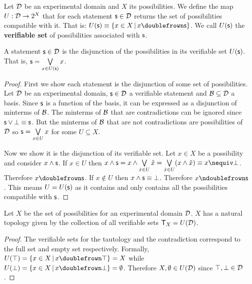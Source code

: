 \documentclass[11pt,letterpaper,fleqn]{memoir} %
\begin{document}
\begin{mathSection}
	
\begin{defn}
	Let $\mathcal{D}$ be an experimental domain and $X$ its possibilities. We define the map $U : \mathcal{D} \rightarrow 2^X$ that for each statement $\mathsf{s} \in \mathcal{D}$ returns the set of possibilities compatible with it. That is: $U(\obs)\equiv\{ x \in X \, | \, x \comp \obs\}$. We call $U(\mathsf{s})$ the \textbf{verifiable set} of possibilities associated with $\mathsf{s}$.
\end{defn}

\begin{prop}
	A statement $\mathsf{s} \in \mathcal{D}$ is the disjunction of the possibilities in its verifiable set $U(\mathsf{s})$. That is, $\mathsf{s}=\bigvee\limits_{x \in U(\mathsf{s})} x$.
\end{prop}
\begin{proof}
	First we show each statement is the disjunction of some set of possibilities. Let $\mathcal{D}$ be an experimental domain, $\mathsf{s} \in \mathcal{D}$ a verifiable statement and $\mathcal{B} \subseteq \mathcal{D}$ a basis. Since $\mathsf{s}$ is a function of the basis, it can be expressed as a disjunction of minterms of $\mathcal{B}$. The minterms of $\mathcal{B}$ that are contradictions can be ignored since $\mathsf{s} \vee \bot \equiv \mathsf{s}$. But the minterms of $\mathcal{B}$ that are not contradictions are possibilities of $\mathcal{D}$ so $\mathsf{s}=\bigvee\limits_{x \in U} x$ for some $U \subseteq X$.
	
	Now we show it is the disjunction of its verifiable set. Let $x \in X$ be a possibility and consider $x \wedge \mathsf{s}$. If $x\in U$ then $x \AND \obs = x \AND \bigOR\limits_{\hat{x} \in U} \hat{x} = \bigOR\limits_{\hat{x} \in U} ( x \AND \hat{x}) \equiv x \nequiv \contradiction$. Therefore $x \comp \obs$. If $x \notin U$ then $x \wedge \mathsf{s} \equiv \bot$. Therefore $x \ncomp \obs$. This means $U=U(\mathsf{s})$ as it contains and only contains all the possibilities compatible with $\mathsf{s}$.
\end{proof}

\begin{prop}
	Let $X$ be the set of possibilities for an experimental domain $\mathcal{D}$. $X$ has a natural topology given by the collection of all verifiable sets $\mathsf{T}_X=U(\mathcal{D})$.
\end{prop}

\begin{proof}
	The verifiable sets for the tautology and the contradiction correspond to the full set and empty set respectively. Formally, $U(\tautology) = \{ x \in X \, | \, x \comp \tautology\} = X$ while $U(\contradiction) = \{ x \in X \, | \, x \comp \contradiction\} = \emptyset$. Therefore $X, \emptyset \in U(\mathcal{D})$ since $\top, \bot \in \mathcal{D}$.


\end{proof}
\end{mathSection}
\end{document}

